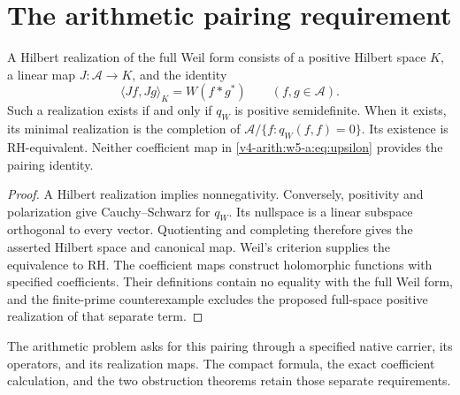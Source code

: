 \section{The arithmetic pairing requirement}
\label{v4-arith:w5-a:form}

\begin{theorem}
\label{v4-arith:w5-a:thm:hpli-form}
A Hilbert realization of the full Weil form consists of a positive
Hilbert space $K$, a linear map $J:\mathscr A\to K$, and the identity
\[
 \langle Jf,Jg\rangle_K=W(f*g^*)\qquad(f,g\in\mathscr A).
\]
Such a realization exists if and only if $q_W$ is positive semidefinite.
When it exists, its minimal realization is the completion of
$\mathscr A/\{f:q_W(f,f)=0\}$. Its existence is RH-equivalent.
Neither coefficient map in \eqref{v4-arith:w5-a:eq:upsilon}
provides the pairing identity.
\end{theorem}
\begin{proof}
A Hilbert realization implies nonnegativity. Conversely, positivity
and polarization give Cauchy--Schwarz for $q_W$. Its nullspace is a
linear subspace orthogonal to every vector. Quotienting and completing
therefore gives the asserted Hilbert space and canonical map.
Weil's criterion supplies the equivalence to RH. The coefficient
maps construct holomorphic functions with specified coefficients.
Their definitions contain no equality with the full Weil form, and
the finite-prime counterexample excludes the proposed full-space
positive realization of that separate term.
\end{proof}

The arithmetic problem asks for this pairing through a specified
native carrier, its operators, and its realization maps. The compact
formula, the exact coefficient calculation, and the two obstruction
theorems retain those separate requirements.

